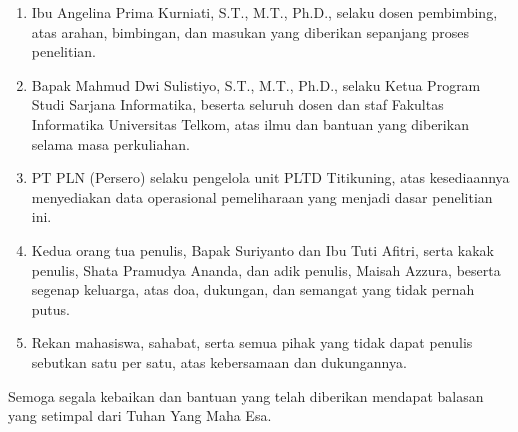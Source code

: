 \begin{enumerate}
  \item Ibu Angelina Prima Kurniati, S.T., M.T., Ph.D., selaku dosen pembimbing, atas arahan, bimbingan, dan masukan yang diberikan sepanjang proses penelitian.
  \item Bapak Mahmud Dwi Sulistiyo, S.T., M.T., Ph.D., selaku Ketua Program Studi Sarjana Informatika, beserta seluruh dosen dan staf Fakultas Informatika Universitas Telkom, atas ilmu dan bantuan yang diberikan selama masa perkuliahan.
  \item PT PLN (Persero) selaku pengelola unit PLTD Titikuning, atas kesediaannya menyediakan data operasional pemeliharaan yang menjadi dasar penelitian ini.
  \item Kedua orang tua penulis, Bapak Suriyanto dan Ibu Tuti Afitri, serta kakak penulis, Shata Pramudya Ananda, dan adik penulis, Maisah Azzura, beserta segenap keluarga, atas doa, dukungan, dan semangat yang tidak pernah putus.
  \item Rekan mahasiswa, sahabat, serta semua pihak yang tidak dapat penulis sebutkan satu per satu, atas kebersamaan dan dukungannya.
\end{enumerate}

Semoga segala kebaikan dan bantuan yang telah diberikan mendapat balasan yang setimpal dari Tuhan Yang Maha Esa.

